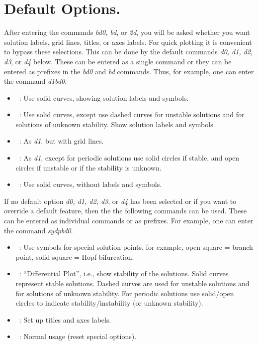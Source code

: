 \section{ Default Options.} \label{sec:PLAUT_default}
After entering the commands {\it bd0, bd}, or {\it 2d}, you will be asked whether you 
want solution labels, grid lines, titles, or axes labels.
For quick plotting it is convenient to bypass these selections.
This can be done by the default commands {\it d0, d1, d2, d3}, or {\it d4} below.
These can be entered as a single command 
or they can be entered as prefixes in the {\it bd0} and {\it bd} commands. 
Thus, for example, one can enter the command {\it d1bd0}.  

\begin{itemize}
\item[\commandf{ d0}]~:  Use solid curves, showing solution labels and symbols.  
\item[\commandf{ d1}]~:  Use solid curves, except use dashed curves for unstable
  solutions and for solutions of unknown stability.
  Show solution labels and symbols.
\item[\commandf{ d2}]~:  As {\it d1}, but with grid lines.  
\item[\commandf{ d3}]~:  As {\it d1}, except for periodic solutions use 
  solid circles if stable,
  and open circles if unstable or if the stability
  is unknown.
\item[\commandf{ d4}]~:  Use solid curves, without labels and symbols.  
\end{itemize}

If no default option {\it d0, d1, d2, d3}, or {\it d4} has been selected 
or if you want to override a default feature,
then the the following commands can be used.
These can be entered as individual commands or as prefixes.
For example, one can enter the command {\it sydpbd0}.

\begin{itemize}
\item[\commandf{ sy}]~:  Use symbols for special solution points, for example,
  open square = branch point,
  solid square = Hopf bifurcation.
\item[\commandf{ dp}]~:  ``Differential Plot'', i.e., show stability of the 
  solutions. Solid curves represent stable solutions.
  Dashed curves are used for unstable
  solutions and for solutions of unknown stability.
  For periodic solutions use solid/open circles
  to indicate stability/instability (or unknown
  stability).
\item[\commandf{ st}]~:  Set up titles and axes labels. 
\item[\commandf{ nu}]~:  Normal usage (reset special options). 
\end{itemize}


